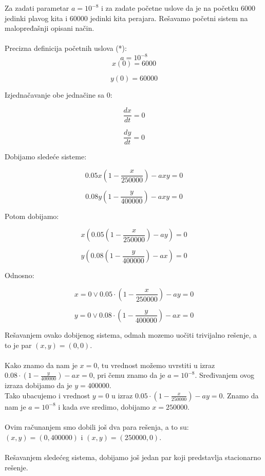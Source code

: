 \documentclass[a4paper]{article}
\begin{document}
{	\newpage
	
	Za zadati parametar $a = 10^{-8} $ i za zadate početne uslove da je na početku 6000 jedinki plavog kita i 60000 jedinki kita perajara. Rešavamo početni sistem na malopređašnji opisani način. \\ 
	\\

	Precizna definicija početnih uslova (*): \\
	\[
		a = 10^{-8}
	\]
	\[
		x(0) = 6000
	\]

	\[
		y(0) = 60 000
	\]
	
	Izjednačavanje obe jednačine sa 0:
	
	\begin{equation}
		\frac{dx}{dt} = 0 
	\end{equation}

	\begin{equation}
		\frac{dy}{dt} = 0
	\end{equation}
	
	Dobijamo sledeće sisteme:
	
	\begin{equation}
		0.05x(1 - \frac{x}{250000}) - axy = 0
	\end{equation}
	
	\begin{equation}
		0.08y(1 - \frac{y}{400000}) - axy = 0
	\end{equation}
		
	Potom dobijamo:
	
	\[
		x(0.05(1 - \frac{x}{250000}) - ay) = 0
	\]
	
	\[
		y(0.08(1 - \frac{y}{400000}) - ax) = 0
	\]
	
	Odnosno: 
	
	\begin{equation}
		x = 0   \vee    0.05 \cdot (1 - \frac{x}{250000}) - ay = 0
	\end{equation}

	\begin{equation}
		y = 0   \vee    0.08 \cdot (1 - \frac{y}{400000}) - ax = 0
	\end{equation}
		
	Rešavanjem ovako dobijenog sistema, odmah mozemo uočiti trivijalno rešenje, a to je par $(x, y) = (0, 0)$. \\
	\\
	Kako znamo da nam je $x = 0$, tu vrednost možemo uvrstiti u izraz $0.08 \cdot (1 - \frac{y}{400000}) - ax = 0$, pri čemu znamo da je $a = 10^{-8}$. Sređivanjem ovog izraza dobijamo da je $y = 400000$. \\
	Tako ubacujemo i vrednost $y = 0$ u izraz $0.05 \cdot (1 - \frac{x}{250000}) - ay = 0$. Znamo da nam je $a = 10^{-8}$ i kada sve sredimo, dobijamo $x = 250000$. \\
	\\
	Ovim računanjem smo dobili još dva para rešenja, a to su: $(x, y) = (0, 400000)$ i $(x, y) = (250000, 0)$.\\
	\\
	Rešavanjem sledećeg sistema, dobijamo još jedan par koji predstavlja stacionarno rešenje.\\
	\\	  
	
}
\end{document}
